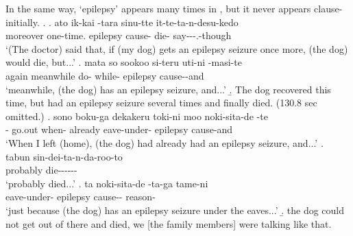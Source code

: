 In the same way,
 `epilepsy' appears many times in \Next,
but it never appears clause-initially.
%
\ex.\label{WO:ClauseInit:Given:tenkan}
 \ag. ato ik-kai  -tara sinu-tte it-te-ta-n-desu-kedo \\
      moreover one-time. epilepsy cause- die- say---.-though \\
      `(The doctor) said that, if (my dog) gets an epilepsy seizure once more, (the dog) would die, but...'
 \bg. mata so sookoo si-teru uti-ni  -masi-te \\
      again  meanwhile do- while- epilepsy cause--and \\
      `meanwhile, (the dog) has an epilepsy seizure, and...'
 \b. The dog recovered this time, but had an epilepsy seizure several times and finally died. (130.8 sec omitted.)
 \bg. sono boku-ga dekakeru toki-ni moo noki-sita-de  -te \\
       - go.out when- already eave-under- epilepsy cause-and \\
      `When I left (home), (the dog) had already had an epilepsy seizure, and...'
 \bg. tabun sin-dei-ta-n-da-roo-to \\
      probably die------\\
      `probably died...'
 \bg. ta noki-sita-de  -ta-ga tame-ni \\
       eave-under- epilepsy cause-- reason- \\
      `just because (the dog) has an epilepsy seizure under the eaves...'
 \b. the dog could not get out of there and died, we [the family members] were talking like that.


